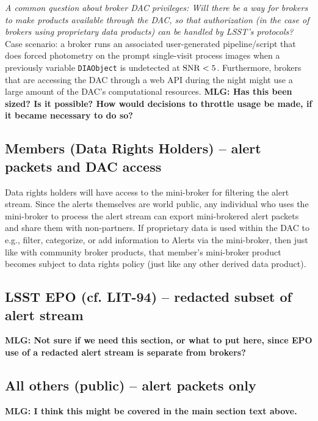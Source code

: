 {\it A common question about broker DAC privileges: Will there be a way for brokers to make products available through the DAC, so that authorization (in the case of brokers using proprietary data products) can be handled by LSST's protocols?} Case scenario: a broker runs an associated user-generated pipeline/script that does forced photometry on the prompt single-visit process images when a previously variable {\tt DIAObject} is undetected at ${\rm SNR}<5$. Furthermore, brokers that are accessing the DAC through a web API during the night might use a large amount of the DAC's computational resources. {\bf MLG: Has this been sized? Is it possible? How would decisions to throttle usage be made, if it became necessary to do so?}


\subsection{Members (Data Rights Holders) -- alert packets and DAC access}

Data rights holders will have access to the mini-broker for filtering the alert stream. Since the alerts themselves are world public, any individual who uses the mini-broker to process the alert stream can export mini-brokered alert packets and share them with non-partners. If proprietary data is used within the DAC to e.g., filter, categorize, or add information to Alerts via the mini-broker, then just like with community broker products, that member's mini-broker product becomes subject to data rights policy (just like any other derived data product).



\subsection{LSST EPO (cf. LIT-94) -- redacted subset of alert stream}
{\bf MLG: Not sure if we need this section, or what to put here, since EPO use of a redacted alert stream is separate from brokers?}

\subsection{All others (public) -- alert packets only}


{\bf MLG: I think this might be covered in the main section text above.}


